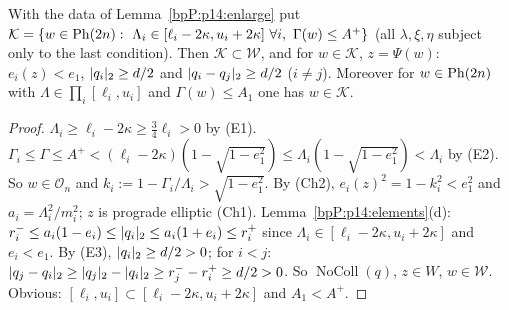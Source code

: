 \begin{lemma}\label{bpP:p14:real-domain}
With the data of Lemma~\ref{bpP:p14:enlarge} put $\mathcal K=\{w\in\Ph{2n}:\ \Lambda_i\in[\ell_i-2\kappa,u_i+2\kappa]\ \forall i,\ \Gamma(w)\le A^+\}$ (all $\lambda,\xi,\eta$ subject only to the last condition). Then $\mathcal K\subset\mathcal W$, and for $w\in\mathcal K$, $z=\Psi(w)$: $e_i(z)<e_1$, $\lvert q_i\rvert_2\ge d/2$ and $\lvert q_i-q_j\rvert_2\ge d/2$ ($i\ne j$).
Moreover for $w\in\mathrm{Ph}(2n)$ with $\Lambda\in\prod_i[\ell_i,u_i]$ and $\Gamma(w)\le A_1$ one has $w\in\mathcal K$.
\end{lemma}
\begin{proof}
\label{stepP:p14:rd-o} $\Lambda_i\ge\ell_i-2\kappa\ge\frac34\ell_i>0$ by (E1). $\Gamma_i\le\Gamma\le A^+<(\ell_i-2\kappa)(1-\sqrt{1-e_1^2})\le\Lambda_i(1-\sqrt{1-e_1^2})<\Lambda_i$ by (E2). So $w\in\mathcal O_n$ and $k_i:=1-\Gamma_i/\Lambda_i>\sqrt{1-e_1^2}$.
\label{stepP:p14:rd-ecc} By (Ch2), $e_i(z)^2=1-k_i^2<e_1^2$ and $a_i=\Lambda_i^2/m_i^2$; $z$ is prograde elliptic (Ch1). Lemma~\ref{bpP:p14:elements}(d): $r_i^-\le a_i(1-e_i)\le\lvert q_i\rvert_2\le a_i(1+e_i)\le r_i^+$ since $\Lambda_i\in[\ell_i-2\kappa,u_i+2\kappa]$ and $e_i<e_1$.
\label{stepP:p14:rd-sep} By (E3), $\lvert q_i\rvert_2\ge d/2>0$; for $i<j$: $\lvert q_j-q_i\rvert_2\ge\lvert q_j\rvert_2-\lvert q_i\rvert_2\ge r_j^--r_i^+\ge d/2>0$. So $\operatorname{NoColl}(q)$, $z\in W$, $w\in\mathcal W$.
\label{stepP:p14:rd-last} Obvious: $[\ell_i,u_i]\subset[\ell_i-2\kappa,u_i+2\kappa]$ and $A_1<A^+$.
\end{proof}

